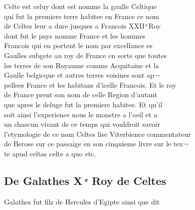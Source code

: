 \documentclass[12pt]{article}
\begin{document}
Celte est celuy dont est nomme la gaulle
            Celtique\\
qui fut la premiere terre habitee en France ce nom\\
de
          Celtes leur a dure jusques a Francois XXII ͤ Roy\\
dont fut le pays nomme France
          et les hommes\\
Francois qui en portent le nom par excellance es\\
Gaulles
          subgete au roy de France en sorte que toutes\\
les terres de son Royaume comme
          Acquitaine et la\\
Gaulle belgicque et autres terres voisines sont ap¬\\
pellees France et les habitans d'icelle Francois. Et le roy\\
de France prent
          son nom de celle Region d'autant\\
que apres le deluge fut la premiere habitee.
          Et qu'il\\
soit ainsi l'experience nous le monstre a l'oeil et a\\
un
          chascun vivant de ce temps qui vouldroit savoir\\
l'etymologie de ce nom Celtes
          lise Viterbience commentateur\\
de Berose sur
          ce passaige en son cinquieme livre sur le tex¬\\
te apud celtas celte a quo etc.





\subsection*{De Galathes X ͤ Roy de Celtes}


Galathes fut filz de Hercules d'Egipte ainsi que
          dit
\end{document}
